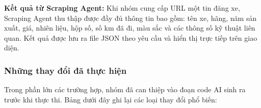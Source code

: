 \noindent\textbf{Kết quả từ Scraping Agent:}
Khi nhóm cung cấp URL một tin đăng xe, Scraping Agent thu thập được đầy đủ thông tin bao gồm: tên xe, hãng, năm sản xuất, giá, nhiên liệu, hộp số, số km đã đi, màu sắc và các thông số kỹ thuật liên quan. Kết quả được lưu ra file JSON theo yêu cầu và hiển thị trực tiếp trên giao diện.

\subsubsection{Những thay đổi đã thực hiện}
\label{subsubsec:ai_changes}

Trong phần lớn các trường hợp, nhóm đã can thiệp vào đoạn code AI sinh ra trước khi thực thi. Bảng dưới đây ghi lại các loại thay đổi phổ biến:


